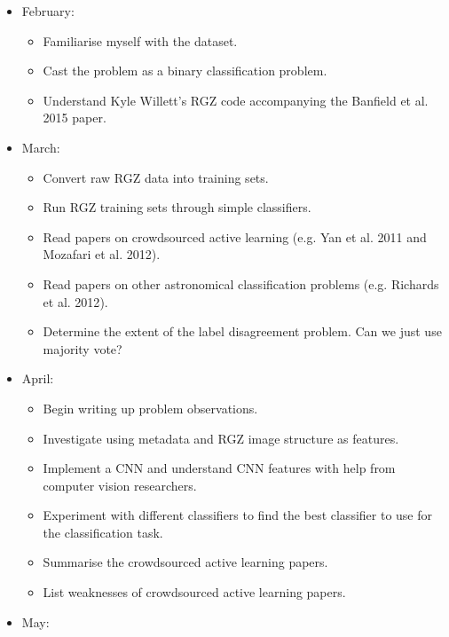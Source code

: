 \documentclass[a4paper]{article}
\begin{document}
        \begin{itemize}
            \item February: \begin{itemize}
                    \item Familiarise myself with the dataset.
                    \item Cast the problem as a binary classification problem.
                    \item Understand Kyle Willett's RGZ code accompanying the Banfield et al. 2015 paper.
                \end{itemize}
            \item March: \begin{itemize}
                    \item Convert raw RGZ data into training sets.
                    \item Run RGZ training sets through simple classifiers.
                    \item Read papers on crowdsourced active learning (e.g. Yan et al. 2011\cite{yan11} and Mozafari et al. 2012\cite{mozafari12}).
                    \item Read papers on other astronomical classification problems (e.g. Richards et al. 2012\cite{richards12}).
                    \item Determine the extent of the label disagreement problem. Can we just use majority vote?
                \end{itemize}
            \item April: \begin{itemize}
                    \item Begin writing up problem observations.
                    \item Investigate using metadata and RGZ image structure as features.
                    \item Implement a CNN and understand CNN features with help from computer vision researchers.
                    \item Experiment with different classifiers to find the best classifier to use for the classification task.
                    \item Summarise the crowdsourced active learning papers.
                    \item List weaknesses of crowdsourced active learning papers.
                \end{itemize}
            \item May: \begin{itemize}

\end{itemize}
\end{itemize}
\end{document}
